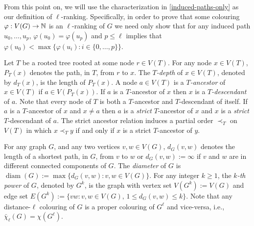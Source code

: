 \documentclass[kpfonts]{patmorin}
\newcommand{\defin}[1]{\emph{\color{brightmaroon}#1}}
\DeclareMathOperator{\diam}{diam}
\newcommand{\dlcn}{\bar{\chi}_\ell}
\theoremstyle{named}
\begin{document}
From this point on, we will use the characterization in \cref{induced-paths-only} as our definition of $\ell$-ranking.  Specifically, in order to prove that some colouring $\varphi:V(G)\to\mathbb{N}$ is an $\ell$-ranking of $G$ we need only show that for any induced path $u_0,\ldots,u_p$, $\varphi(u_0)=\varphi(u_p)$ and $p\le\ell$ implies that $\varphi(u_0)<\max\{\varphi(u_i):i\in\{0,\ldots,p\}\}$.

%
%

Let $T$ be a rooted tree rooted at some node $r\in V(T)$.  For any node $x\in V(T)$, $P_T(x)$ denotes the path, in $T$, from $r$ to $x$.  The \defin{$T$-depth} of $x\in V(T)$, denoted by $d_T(x)$, is the length of $P_T(x)$.  A node $a\in V(T)$ is a \defin{$T$-ancestor} of $x\in V(T)$ if $a\in V(P_T(x))$. If $a$ is a $T$-ancestor of $x$ then $x$ is a \defin{$T$-descendant} of $a$.  Note that every node of $T$ is both a $T$-ancestor and $T$-descendant of itself.  If $a$ is a $T$-ancestor of $x$ and $x\neq a$ then $a$ is a \defin{strict} $T$-ancestor of $x$ and $x$ is a \defin{strict} $T$-descendant of $a$.  The strict ancestor relation induces a partial order $\prec_T$ on $V(T)$ in which $x\prec_T y$ if and only if $x$ is a strict $T$-ancestor of $y$.

For any graph $G$, and any two vertices $v,w\in V(G)$, $d_G(v,w)$ denotes the length of a shortest path, in $G$, from $v$ to $w$ or $d_G(v,w):=\infty$ if $v$ and $w$ are in different connected components of $G$. The \defin{diameter} of $G$ is $\diam(G):=\max\{d_G(v,w):v,w\in V(G)\}$. For any integer $k\ge 1$, the \defin{$k$-th power} of $G$, denoted by $G^k$, is the graph with vertex set $V(G^k):=V(G)$ and edge set $E(G^{k}):=\{vw:v,w\in V(G),\, 1\le d_G(v,w)\le k\}$.
Note that any distance-$\ell$ colouring of $G$ is a proper colouring of $G^\ell$ and vice-versa, i.e., $\dlcn(G)=\chi(G^\ell)$.
\end{document}
